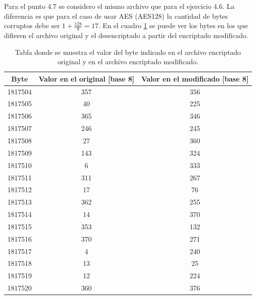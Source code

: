 \documentclass[a4paper,10pt]{article}
\begin{document}
Para el punto 4.7 se considero el mismo archivo que para el ejercicio 4.6. La diferencia es que para el caso de usar
AES (AES128) la cantidad de bytes corruptos debe ser $ 1 + \frac{128}{8} = 17$. En el cuadro \ref{table47} se puede ver los bytes en los que difieren el archivo original y el desencriptado a partir
del encriptado modificado.
\begin{table}
\begin{center}
\begin{tabular}{|c|c|c|}
\hline
Byte & Valor en el original [base 8] & Valor en el modificado [base 8]\\
\hline
\hline
1817504 & 357 & 356 \\
1817505 & 40 & 225 \\
1817506 & 365 & 346 \\
1817507 & 246 & 245 \\
1817508 & 27 & 360 \\
1817509 & 143 & 324 \\
1817510 & 6 & 333 \\
1817511 & 311 & 267\\
1817512 & 17 & 76\\
1817513 & 362 & 255\\
1817514 & 14 & 370\\
1817515 & 353 & 132 \\
1817516 & 370 & 271\\
1817517 & 4 & 240\\
1817518 & 13 & 25\\
1817519 & 12 & 224\\
1817520 & 360 & 376\\
\hline
\end{tabular}
\end{center}
\caption{Tabla donde se muestra el valor del byte indicado en el archivo encriptado original y en el archivo encriptado modificado.}
\label{table47}
\end{table}
\end{document}
